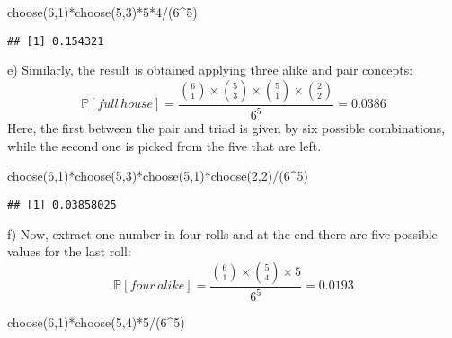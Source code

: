 \documentclass[
]{article}
\newenvironment{Shaded}{\begin{snugshade}}{\end{snugshade}}
\newcommand{\DecValTok}[1]{\textcolor[rgb]{0.00,0.00,0.81}{#1}}
\newcommand{\FunctionTok}[1]{\textcolor[rgb]{0.00,0.00,0.00}{#1}}
\newcommand{\NormalTok}[1]{#1}
\newcommand{\SpecialCharTok}[1]{\textcolor[rgb]{0.00,0.00,0.00}{#1}}
\begin{document}
\begin{Shaded}
\begin{Highlighting}[]
\FunctionTok{choose}\NormalTok{(}\DecValTok{6}\NormalTok{,}\DecValTok{1}\NormalTok{)}\SpecialCharTok{*}\FunctionTok{choose}\NormalTok{(}\DecValTok{5}\NormalTok{,}\DecValTok{3}\NormalTok{)}\SpecialCharTok{*}\DecValTok{5}\SpecialCharTok{*}\DecValTok{4}\SpecialCharTok{/}\NormalTok{(}\DecValTok{6}\SpecialCharTok{\^{}}\DecValTok{5}\NormalTok{)}
\end{Highlighting}
\end{Shaded}

\begin{verbatim}
## [1] 0.154321
\end{verbatim}

e) Similarly, the result is obtained applying three alike and pair
concepts:
\[\mathbb P[full\, house]=\frac{{6 \choose 1} \times {5 \choose 3} \times {5 \choose 1} \times {2 \choose 2}}{6^5}=0.0386\]
Here, the first between the pair and triad is given by six possible
combinations, while the second one is picked from the five that are
left.

\begin{Shaded}
\begin{Highlighting}[]
\FunctionTok{choose}\NormalTok{(}\DecValTok{6}\NormalTok{,}\DecValTok{1}\NormalTok{)}\SpecialCharTok{*}\FunctionTok{choose}\NormalTok{(}\DecValTok{5}\NormalTok{,}\DecValTok{3}\NormalTok{)}\SpecialCharTok{*}\FunctionTok{choose}\NormalTok{(}\DecValTok{5}\NormalTok{,}\DecValTok{1}\NormalTok{)}\SpecialCharTok{*}\FunctionTok{choose}\NormalTok{(}\DecValTok{2}\NormalTok{,}\DecValTok{2}\NormalTok{)}\SpecialCharTok{/}\NormalTok{(}\DecValTok{6}\SpecialCharTok{\^{}}\DecValTok{5}\NormalTok{)}
\end{Highlighting}
\end{Shaded}

\begin{verbatim}
## [1] 0.03858025
\end{verbatim}

f) Now, extract one number in four rolls and at the end there are five
possible values for the last roll:
\[\mathbb P[four\, alike]=\frac{{6 \choose 1} \times {5 \choose 4} \times 5}{6^5}=0.0193\]

\begin{Shaded}
\begin{Highlighting}[]
\FunctionTok{choose}\NormalTok{(}\DecValTok{6}\NormalTok{,}\DecValTok{1}\NormalTok{)}\SpecialCharTok{*}\FunctionTok{choose}\NormalTok{(}\DecValTok{5}\NormalTok{,}\DecValTok{4}\NormalTok{)}\SpecialCharTok{*}\DecValTok{5}\SpecialCharTok{/}\NormalTok{(}\DecValTok{6}\SpecialCharTok{\^{}}\DecValTok{5}\NormalTok{)}
\end{Highlighting}
\end{Shaded}
\end{document}
